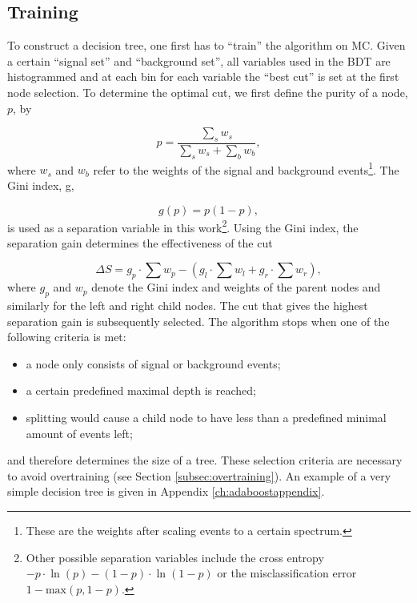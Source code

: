 \subsection{Training}
\label{subsec:training}
To construct a decision tree, one first has to ``train'' the algorithm on MC. Given a certain ``signal set'' and ``background set'', all variables used in the BDT are histogrammed and at each bin for each variable the ``best cut'' is set at the first node selection. To determine the optimal cut, we first define the purity of a node, $p$, by

\begin{equation}
p = \frac{\sum_s w_s}{\sum_s w_s + \sum_b w_b},
\end{equation}
\noindent where $w_s$ and $w_b$ refer to the weights of the signal and background events\footnote{These are the weights after scaling events to a certain spectrum.}. The Gini index, g,

\begin{equation}
g(p) = p(1-p), 
\end{equation}
is used as a separation variable in this work\footnote{Other possible separation variables include the cross entropy $-p \cdot \ln(p)-(1-p) \cdot \ln(1-p)$ or the misclassification error $1-\textrm{max}(p,1-p)$.}. Using the Gini index, the separation gain determines the effectiveness of the cut

\begin{equation}
\label{eq:separationgain}
\Delta S = g_p \cdot \sum w_p - \left(g_l \cdot \sum w_l + g_r \cdot \sum w_r\right),
\end{equation}
\noindent where $g_p$ and $w_p$ denote the Gini index and weights of the parent nodes and similarly for the left and right child nodes. The cut that gives the highest separation gain is subsequently selected. The algorithm stops when one of the following criteria is met:
\vspace{2mm}

\begin{itemize}
\item a node only consists of signal or background events;
\item a certain predefined maximal depth is reached;
\item splitting would cause a child node to have less than a predefined minimal amount of events left;  
\end{itemize}
\vspace{2mm}
and therefore determines the size of a tree. These selection criteria are necessary to avoid overtraining (see Section \ref{subsec:overtraining}). An example of a very simple decision tree is given in Appendix \ref{ch:adaboostappendix}.


